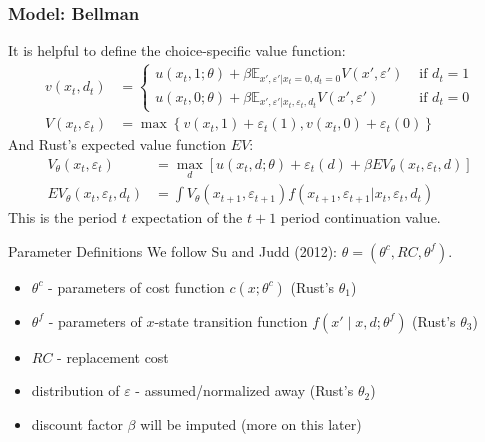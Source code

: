 \documentclass[aspectratio=169,11pt]{beamer}
\begin{document}
\begin{frame}
\frametitle{Model: Bellman}
It is helpful to define the \alert{choice-specific value function}:
\begin{align*}
v (x_t, d_t) &= \left \{
\begin{array}{lr}
 u(x_t, 1;\theta) + \beta \mathbb{E}_{x', \varepsilon ' | x_t = 0, d_t = 0} V(x', \varepsilon ')  & \text{ if } d_t = 1 \\
 u(x_t , 0; \theta) + \beta \mathbb{E}_{x', \varepsilon ' | x_t, \varepsilon_t, d_t} V(x', \varepsilon ')   & \text{ if } d_t = 0
\end{array}
\right .\\
V(x_t,\varepsilon_t) &= \max \left\{
v (x_t, 1) + \varepsilon_{t}(1),
v(x_t, 0) + \varepsilon_{t}(0)
\right\}
\end{align*}
And Rust's \alert{expected value function} $EV$:
 \begin{align*}
		V_{\theta}\left(x_{t},\varepsilon_{t}\right) &= \max_{d} \left[ u \left(x_{t},d;\theta \right) + \varepsilon_{t}(d) +
		\beta EV_{\theta}\left(x_{t},\varepsilon_{t},d \right) \right]\\
	 EV_{\theta}\left(x_{t},\varepsilon_{t},d_{t}\right) &=\int V_{\theta}\left(x_{t+1},\varepsilon_{t+1}\right) f\left(x_{t+1}, \varepsilon_{t+1} |x_{t},\varepsilon_{t},d_{t}\right)
\end{align*}
This is the period $t$ expectation of the $t+1$ period continuation value.

\end{frame}



\begin{frame}{Parameter Definitions}
We follow Su and Judd (2012): $\theta = (\theta^c, RC, \theta^f)$.
\begin{itemize}
	\item $\theta^c$ - parameters of cost function $c(x;\theta^c)$ (Rust's $\theta_1$)
	\item $\theta^f$ - parameters of $x$-state transition function $f(x' \mid x, d;\theta^f)$ (Rust's $\theta_3$)
	\item $RC$ - replacement cost
	\item distribution of $\varepsilon$ - assumed/normalized away (Rust's $\theta_2$)
	\item discount factor $\beta$ will be imputed (more on this later)
\end{itemize}

\end{frame}
\end{document}
